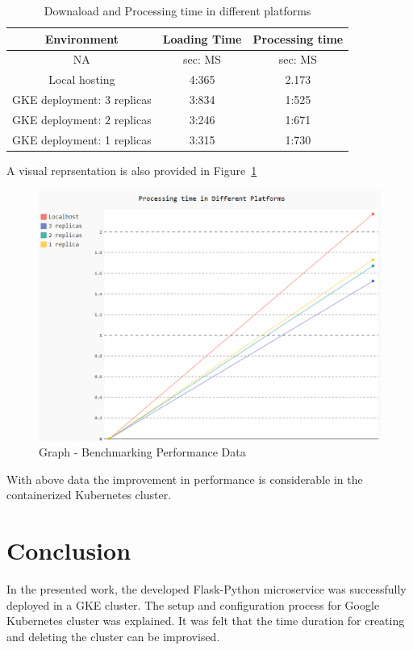 \begin{table}[htb]
	\centering
  \caption{Downaload and Processing time in different platforms}\label{tab:performance}

	\begin{tabular}{*{3}{c}}
		\toprule
		Environment & Loading Time  &  Processing time \\
		\midrule
		NA & sec: MS & sec: MS \\
		\midrule
		Local hosting & 4:365  & 2.173 \\
		GKE deployment: 3 replicas & 3:834 & 1:525 \\
    GKE deployment: 2 replicas & 3:246 & 1:671 \\
    GKE deployment: 1 replicas & 3:315 & 1:730 \\
		\bottomrule
	\end{tabular}
\end{table}
A visual reprsentation is also provided in Figure~\ref{fig:benchmark_graph}
\begin{figure}[htb]
	\centering\includegraphics[width=\columnwidth]{images/hid_417_benchmark_graph.png}
  \caption{Graph - Benchmarking Performance Data}
  \label{fig:benchmark_graph}
\end{figure}
With above data the improvement in performance is considerable in the
containerized Kubernetes cluster.
\section{Conclusion}


In the presented work, the developed Flask-Python microservice was
successfully deployed in a GKE cluster. The setup and configuration process
for Google Kubernetes cluster was explained. It was felt that the time
duration for creating and deleting the cluster can be improvised.

